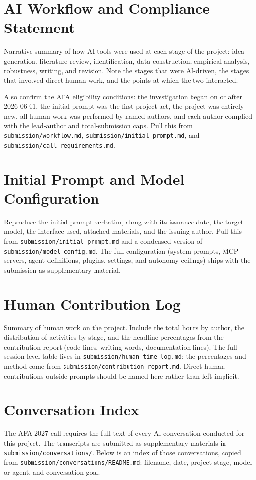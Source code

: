 \documentclass[12pt]{article}
\begin{document}
\appendix

\section{AI Workflow and Compliance Statement}
\label{app:workflow}

Narrative summary of how AI tools were used at each stage of the project:
idea generation, literature review, identification, data construction,
empirical analysis, robustness, writing, and revision. Note the stages that
were AI-driven, the stages that involved direct human work, and the points at
which the two interacted.

Also confirm the AFA eligibility conditions: the investigation began on or
after 2026-06-01, the initial prompt was the first project act, the project was
entirely new, all human work was performed by named authors, and each author
complied with the lead-author and total-submission caps. Pull this from
\texttt{submission/workflow.md},
\texttt{submission/initial\_prompt.md}, and
\texttt{submission/call\_requirements.md}.

\section{Initial Prompt and Model Configuration}
\label{app:prompt}

Reproduce the initial prompt verbatim, along with its issuance date, the
target model, the interface used, attached materials, and the issuing author.
Pull this from \texttt{submission/initial\_prompt.md} and a condensed version
of \texttt{submission/model\_config.md}. The full configuration (system
prompts, MCP servers, agent definitions, plugins, settings, and autonomy
ceilings) ships with the submission as supplementary material.

\section{Human Contribution Log}
\label{app:human}

Summary of human work on the project. Include the total hours by author, the
distribution of activities by stage, and the headline percentages from the
contribution report (code lines, writing words, documentation lines).
The full session-level table lives in \texttt{submission/human\_time\_log.md};
the percentages and method come from \texttt{submission/contribution\_report.md}.
Direct human contributions outside prompts should be named here rather than
left implicit.

\section{Conversation Index}
\label{app:conversations}

The AFA 2027 call requires the full text of every AI conversation conducted
for this project. The transcripts are submitted as supplementary materials in
\texttt{submission/conversations/}. Below is an index of those conversations,
copied from \texttt{submission/conversations/README.md}: filename, date,
project stage, model or agent, and conversation goal.
\end{document}
